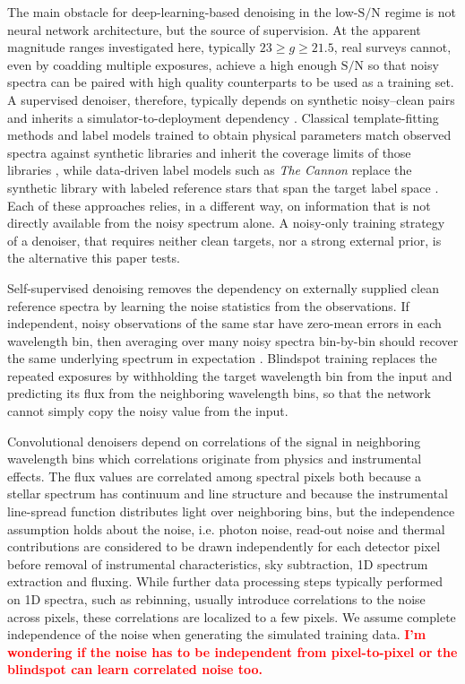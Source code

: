 \documentclass[twocolumn]{aastex7}
\newcommand{\ld}[1]{\textcolor{red}{\textbf{#1}}}
\newcommand{\SNR}{\mathrm{S}/\mathrm{N}}
\begin{document}
The main obstacle for deep-learning-based denoising in the low-$\SNR$ regime is not neural network architecture, but the source of supervision. At the apparent magnitude ranges investigated here, typically $23 \geq g \geq 21.5$, real surveys cannot, even by coadding multiple exposures, achieve a high enough $\SNR$ so that noisy spectra can be paired with high quality counterparts to be used as a training set. A supervised denoiser, therefore, typically depends on synthetic noisy--clean pairs and inherits a simulator-to-deployment dependency \citep{Pal2024_denoising_autoencoder}. Classical template-fitting methods and label models trained to obtain physical parameters match observed spectra against synthetic libraries and inherit the coverage limits of those libraries \citep{Koleva2009_ULySS,Ting2019_Payne}, while data-driven label models such as \textit{The Cannon} replace the synthetic library with labeled reference stars that span the target label space \citep{Ness2015_Cannon}. Each of these approaches relies, in a different way, on information that is not directly available from the noisy spectrum alone. A noisy-only training strategy of a denoiser, that requires neither clean targets, nor a strong external prior, is the alternative this paper tests.

Self-supervised denoising removes the dependency on externally supplied clean reference spectra by learning the noise statistics from the observations. If independent, noisy observations of the same star have zero-mean errors in each wavelength bin, then averaging over many noisy spectra bin-by-bin should recover the same underlying spectrum in expectation \citep{lehtinen2018noise2noise}. Blindspot training replaces the repeated exposures by withholding the target wavelength bin from the input and predicting its flux from the neighboring wavelength bins, so that the network cannot simply copy the noisy value \citep{batson2019noise2self,Krull2019_blindspot,Laine2019_BSN} from the input.

Convolutional denoisers depend on correlations of the signal in neighboring wavelength bins which correlations originate from physics and instrumental effects. The flux values are correlated among spectral pixels both because a stellar spectrum has continuum and line structure and because the instrumental line-spread function distributes light over neighboring bins, but the independence assumption holds about the noise, i.e. photon noise, read-out noise and thermal contributions are considered to be drawn independently for each detector pixel before removal of instrumental characteristics, sky subtraction, 1D spectrum extraction and fluxing. While further data processing steps typically performed on 1D spectra, such as rebinning, usually introduce correlations to the noise across pixels, these correlations are localized to a few pixels. We assume complete independence of the noise when generating the simulated training data. \ld{I'm wondering if the noise has to be independent from pixel-to-pixel or the blindspot can learn correlated noise too.}
\end{document}

